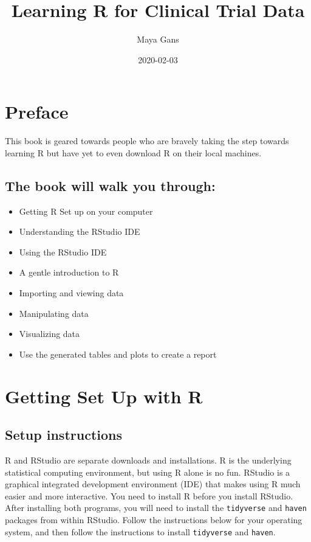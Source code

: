 \documentclass[]{book}
\title{Learning R for Clinical Trial Data}
\author{Maya Gans}
\date{2020-02-03}
\providecommand{\tightlist}{%
  \setlength{\itemsep}{0pt}\setlength{\parskip}{0pt}}
\begin{document}
\maketitle

{
\setcounter{tocdepth}{1}
\tableofcontents
}
\chapter{Preface}\label{preface}

This book is geared towards people who are bravely taking the step
towards learning R but have yet to even download R on their local
machines.

\section{The book will walk you
through:}\label{the-book-will-walk-you-through}

\begin{itemize}
\tightlist
\item
  Getting R Set up on your computer
\item
  Understanding the RStudio IDE
\item
  Using the RStudio IDE
\item
  A gentle introduction to R
\item
  Importing and viewing data
\item
  Manipulating data
\item
  Visualizing data
\item
  Use the generated tables and plots to create a report
\end{itemize}

\chapter{Getting Set Up with R}\label{getting-set-up-with-r}

\section{Setup instructions}\label{setup-instructions}

R and RStudio are separate downloads and installations. R is the
underlying statistical computing environment, but using R alone is no
fun. RStudio is a graphical integrated development environment (IDE)
that makes using R much easier and more interactive. You need to install
R before you install RStudio. After installing both programs, you will
need to install the \texttt{tidyverse} and \texttt{haven} packages from
within RStudio. Follow the instructions below for your operating system,
and then follow the instructions to install \texttt{tidyverse} and
\texttt{haven}.
\end{document}
